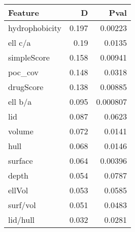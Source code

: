 \begin{tabular}{lrr}
\hline
 Feature        &     D &     Pval \\
\hline
 hydrophobicity & 0.197 & 0.00223  \\
 ell c/a        & 0.19  & 0.0135   \\
 simpleScore    & 0.158 & 0.00941  \\
 poc\_cov        & 0.148 & 0.0318   \\
 drugScore      & 0.138 & 0.00885  \\
 ell b/a        & 0.095 & 0.000807 \\
 lid            & 0.087 & 0.0623   \\
 volume         & 0.072 & 0.0141   \\
 hull           & 0.068 & 0.0146   \\
 surface        & 0.064 & 0.00396  \\
 depth          & 0.054 & 0.0787   \\
 ellVol         & 0.053 & 0.0585   \\
 surf/vol       & 0.051 & 0.0483   \\
 lid/hull       & 0.032 & 0.0281   \\
\hline
\end{tabular}